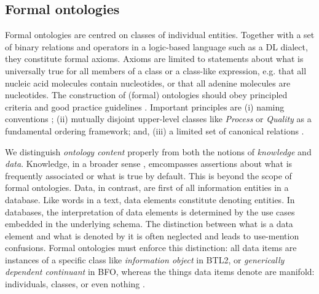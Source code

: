 \subsection{Formal ontologies}

Formal ontologies are centred on classes of individual entities. Together with a set of binary relations and operators in a logic-based language such as a DL dialect, they constitute formal axioms. Axioms are limited to statements about what is universally true for all members of a class or a class-like expression, e.g. that all nucleic acid molecules contain nucleotides, or that all adenine molecules are nucleotides. The construction of (formal) ontologies should obey principled criteria \citep{Spear2006} and good practice guidelines \citep{Schulz2012}. Important principles are (i) naming conventions \citep{Schober2009}; (ii) mutually disjoint upper-level classes like \emph{Process} or \emph{Quality} as a fundamental ordering framework; and, (iii) a limited set of canonical relations \citep{Smith2005}. 

We distinguish \emph{ontology content} properly from both the notions of \emph{knowledge} \citep{Naturwissenschaften2014} and \emph{data}. Knowledge, in a broader sense \citep{Rector2008}, emcompasses assertions about what is frequently associated or what is true by default. This is beyond the scope of formal ontologies. Data, in contrast, are first of all information entities in a database. Like words in a text, data elements constitute denoting entities. 
In databases, the interpretation of data elements is determined by the use cases embedded in the underlying schema. The distinction between what is a data element and what is denoted by it is often neglected and leads to use-mention confusions. Formal ontologies must enforce this distinction: 
all data items are instances of a specific class like \textit{information object} in BTL2, or \textit{generically dependent continuant} in BFO, whereas the things data items denote are manifold: individuals, classes, or even nothing \citep{Schulz2011a}.

